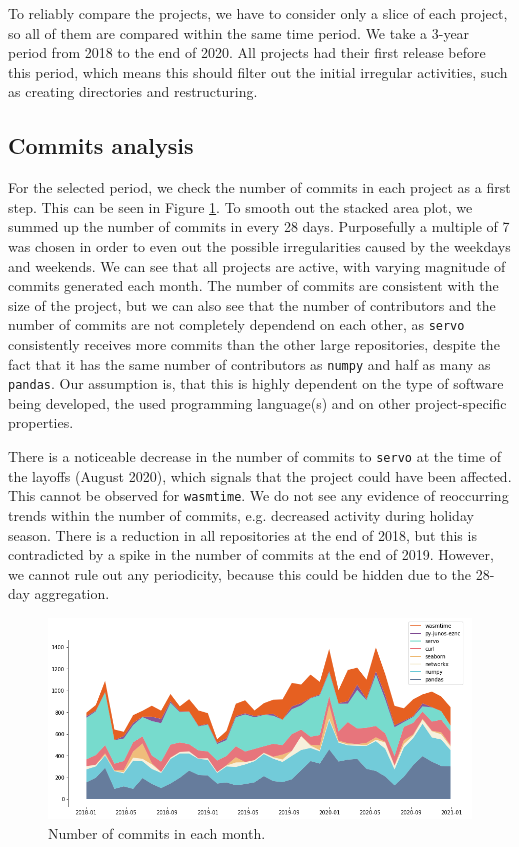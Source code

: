 To reliably compare the projects, we have to consider only a slice of each project, so all of them are compared within the same time period. We take a 3-year period from 2018 to the end of 2020. All projects had their first release before this period, which means this should filter out the initial irregular activities, such as creating directories and restructuring.

\subsection{Commits analysis}

For the selected period, we check the number of commits in each project as a first step. This can be seen in Figure \ref{fig:commits}. To smooth out the stacked area plot, we summed up the number of commits in every 28 days. Purposefully a multiple of 7 was chosen in order to even out the possible irregularities caused by the weekdays and weekends. We can see that all projects are active, with varying magnitude of commits generated each month. The number of commits are consistent with the size of the project, but we can also see that the number of contributors and the number of commits are not completely dependend on each other, as \texttt{servo} consistently receives more commits than the other large repositories, despite the fact that it has the same number of contributors as \texttt{numpy} and half as many as \texttt{pandas}. Our assumption is, that this is highly dependent on the type of software being developed, the used programming language(s) and on other project-specific properties.

There is a noticeable decrease in the number of commits to \texttt{servo} at the time of the layoffs (August 2020), which signals that the project could have been affected. This cannot be observed for \texttt{wasmtime}. We do not see any evidence of reoccurring trends within the number of commits, e.g. decreased activity during holiday season. There is a reduction in all repositories at the end of 2018, but this is contradicted by a spike in the number of commits at the end of 2019. However, we cannot rule out any periodicity, because this could be hidden due to the 28-day aggregation.

\begin{figure}
    \centering
    \includegraphics[width=\textwidth]{figures/commits.png}
    \caption{Number of commits in each month.}
    \label{fig:commits}
\end{figure}

